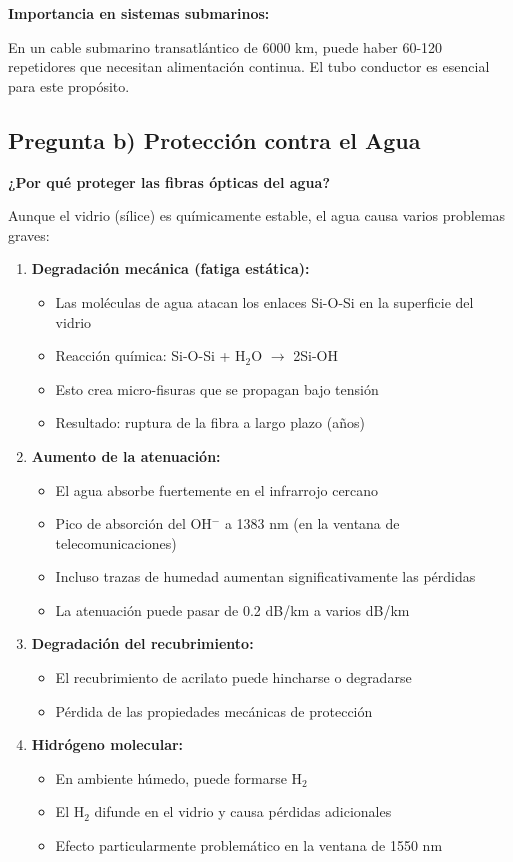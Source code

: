 \documentclass[11pt,a4paper]{article}
\begin{document}
\textbf{Importancia en sistemas submarinos:}

En un cable submarino transatlántico de 6000 km, puede haber 60-120 repetidores que necesitan alimentación continua. El tubo conductor es esencial para este propósito.

\subsection{Pregunta b) Protección contra el Agua}

\textbf{¿Por qué proteger las fibras ópticas del agua?}

Aunque el vidrio (sílice) es químicamente estable, el agua causa varios problemas graves:

\begin{enumerate}
    \item \textbf{Degradación mecánica (fatiga estática):}
    \begin{itemize}
        \item Las moléculas de agua atacan los enlaces Si-O-Si en la superficie del vidrio
        \item Reacción química: Si-O-Si + H$_2$O $\rightarrow$ 2Si-OH
        \item Esto crea micro-fisuras que se propagan bajo tensión
        \item Resultado: ruptura de la fibra a largo plazo (años)
    \end{itemize}
    
    \item \textbf{Aumento de la atenuación:}
    \begin{itemize}
        \item El agua absorbe fuertemente en el infrarrojo cercano
        \item Pico de absorción del OH$^-$ a 1383 nm (en la ventana de telecomunicaciones)
        \item Incluso trazas de humedad aumentan significativamente las pérdidas
        \item La atenuación puede pasar de 0.2 dB/km a varios dB/km
    \end{itemize}
    
    \item \textbf{Degradación del recubrimiento:}
    \begin{itemize}
        \item El recubrimiento de acrilato puede hincharse o degradarse
        \item Pérdida de las propiedades mecánicas de protección
    \end{itemize}
    
    \item \textbf{Hidrógeno molecular:}
    \begin{itemize}
        \item En ambiente húmedo, puede formarse H$_2$
        \item El H$_2$ difunde en el vidrio y causa pérdidas adicionales
        \item Efecto particularmente problemático en la ventana de 1550 nm
    \end{itemize}
\end{enumerate}
\end{document}
